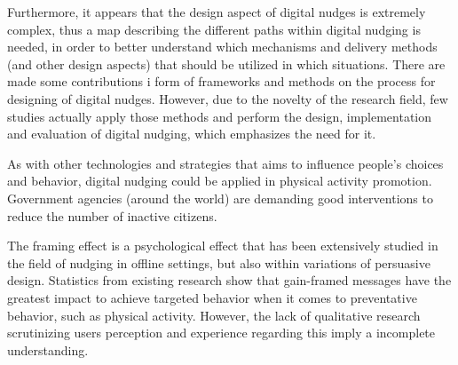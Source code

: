 Furthermore, it appears that the design aspect of digital nudges is extremely complex, thus a map describing the different paths within digital nudging is needed, in order to better understand which mechanisms and delivery methods (and other design aspects) that should be utilized in which situations. There are made some contributions i form of frameworks and methods on the process for designing of digital nudges. However, due to the novelty of the research field, few studies actually apply those methods and perform the design, implementation and evaluation of digital nudging, which emphasizes the need for it.

As with other technologies and strategies that aims to influence people's choices and behavior, digital nudging could be applied in physical activity promotion. Government agencies (around the world) are demanding good interventions to reduce the number of inactive citizens.

The framing effect is a psychological effect that has been extensively studied in the field of nudging in offline settings, but also within variations of persuasive design. Statistics from existing research show that gain-framed messages have the greatest impact to achieve targeted behavior when it comes to preventative behavior, such as physical activity. However, the lack of qualitative research scrutinizing users perception and experience regarding this imply a incomplete understanding. 
